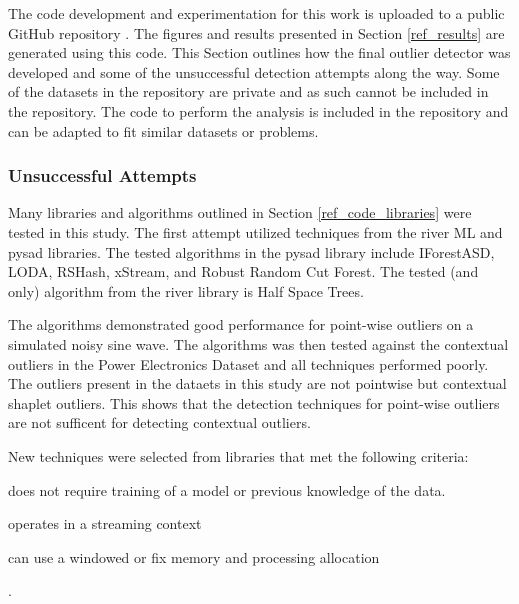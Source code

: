 The code development and experimentation for this work is uploaded to a public GitHub repository \parencite{BeattieGithub2022}. The figures and results presented in Section \ref{ref_results} are generated using this code. This Section outlines how the final outlier detector was developed and some of the unsuccessful detection attempts along the way. Some of the datasets in the repository are private and as such cannot be included in the repository. The code to perform the analysis is included in the repository and can be adapted to fit similar datasets or problems.


\subsubsection{Unsuccessful Attempts}

Many libraries and algorithms outlined in Section \ref{ref_code_libraries} were tested in this study. The first attempt utilized techniques from the river ML \parencite{2020river} and pysad \parencite{pysad} libraries.  The tested algorithms in the pysad library include IForestASD, LODA, RSHash, xStream, and Robust Random Cut Forest. The tested (and only) algorithm from the river library is Half Space Trees.

The algorithms demonstrated good performance for point-wise outliers on a simulated noisy sine wave. The algorithms was then tested against the contextual outliers in the Power Electronics Dataset and all techniques performed poorly. The outliers present in the dataets in this study are not pointwise but contextual shaplet outliers.
This shows that the detection techniques for point-wise outliers are not sufficent for detecting contextual outliers.

New techniques were selected from libraries that met the following criteria:
\begin{inlinelist}
    \item does not require training of a model or previous knowledge of the data.
    \item operates in a streaming context
    \item can use a windowed or fix memory and processing allocation
\end{inlinelist}. 

